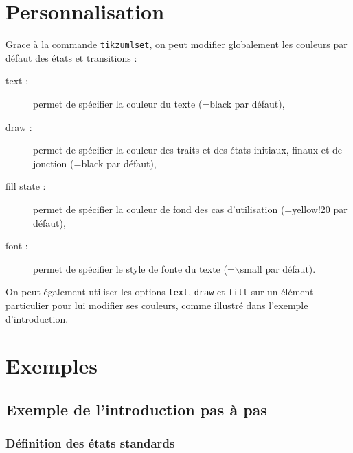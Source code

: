 \documentclass[a4paper,11pt]{report}
\newcommand{\inputTikZ}[1]{%
  }%
\newcommand{\inputTikZ}[1]{%
    \texttt{[image: fig/\#1.pdf]}%
  }%
\begin{document}
\section{Personnalisation}\label{s.fitstatetrans}

Grace à la commande {\tt tikzumlset}, on peut modifier globalement les couleurs par défaut des états et transitions :

\begin{description}
\item[text :] permet de spécifier la couleur du texte (=black par défaut),
\item[draw :] permet de spécifier la couleur des traits et des états initiaux, finaux et de jonction (=black par défaut),
\item[fill state :] permet de spécifier la couleur de fond des cas d'utilisation (=yellow!20 par défaut),
\item[font :] permet de spécifier le style de fonte du texte (=$\backslash$small par défaut).
\end{description}

On peut également utiliser les options {\tt text}, {\tt draw} et {\tt fill} sur un élément particulier pour lui modifier ses couleurs, comme illustré dans l'exemple d'introduction.

\section{Exemples}

\subsection{Exemple de l'introduction pas à pas}

\subsubsection{Définition des états standards}

\medskip

\begin{center}
\inputTikZ{figure61}
\end{center}

\newpage

{\color{red!70!black}
\vspace{-0.37cm}
\vspace{-0.37cm}
\vspace{-0.37cm}
\vspace{-0.37cm}
\vspace{-0.37cm}

}
\end{document}
